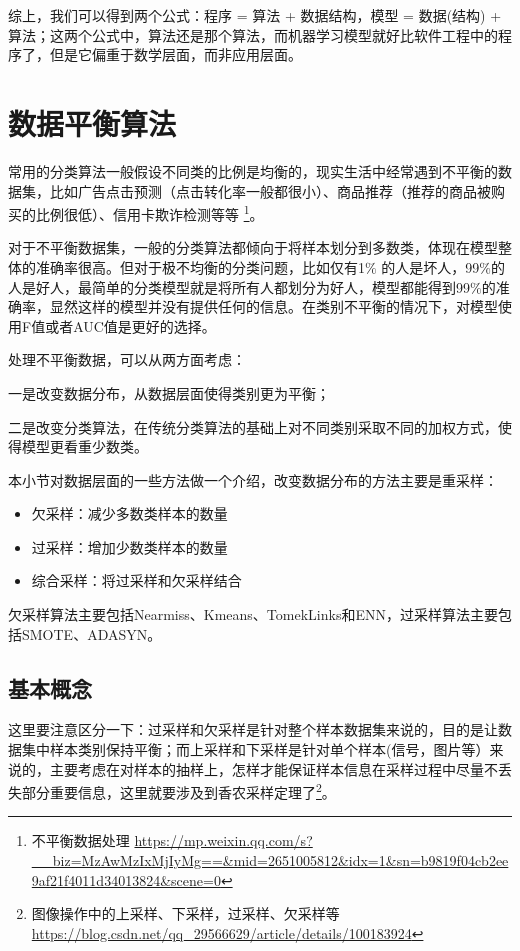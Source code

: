 综上，我们可以得到两个公式：程序 = 算法 + 数据结构，模型 = 数据(结构) + 算法；这两个公式中，算法还是那个算法，而机器学习模型就好比软件工程中的程序了，但是它偏重于数学层面，而非应用层面。

\section{数据平衡算法}

常用的分类算法一般假设不同类的比例是均衡的，现实生活中经常遇到不平衡的数据集，比如广告点击预测（点击转化率一般都很小）、商品推荐（推荐的商品被购买的比例很低）、信用卡欺诈检测等等 \footnote{不平衡数据处理 \quad \url{https://mp.weixin.qq.com/s?__biz=MzAwMzIxMjIyMg==&mid=2651005812&idx=1&sn=b9819f04cb2ee9af21f4011d34013824&scene=0}}。

对于不平衡数据集，一般的分类算法都倾向于将样本划分到多数类，体现在模型整体的准确率很高。但对于极不均衡的分类问题，比如仅有1$\%$ 的人是坏人，99$\%$的人是好人，最简单的分类模型就是将所有人都划分为好人，模型都能得到99$\%$的准确率，显然这样的模型并没有提供任何的信息。在类别不平衡的情况下，对模型使用F值或者AUC值是更好的选择。

处理不平衡数据，可以从两方面考虑：

一是改变数据分布，从数据层面使得类别更为平衡；

二是改变分类算法，在传统分类算法的基础上对不同类别采取不同的加权方式，使得模型更看重少数类。

本小节对数据层面的一些方法做一个介绍，改变数据分布的方法主要是重采样：
\begin{itemize}
    \item 欠采样：减少多数类样本的数量
    \item 过采样：增加少数类样本的数量
    \item 综合采样：将过采样和欠采样结合
\end{itemize}

欠采样算法主要包括Nearmiss、Kmeans、TomekLinks和ENN，过采样算法主要包括SMOTE、ADASYN。

\subsection{基本概念}

这里要注意区分一下：过采样和欠采样是针对整个样本数据集来说的，目的是让数据集中样本类别保持平衡；而上采样和下采样是针对单个样本(信号，图片等）来说的，主要考虑在对样本的抽样上，怎样才能保证样本信息在采样过程中尽量不丢失部分重要信息，这里就要涉及到香农采样定理了\footnote{图像操作中的上采样、下采样，过采样、欠采样等 \quad \url{https://blog.csdn.net/qq_29566629/article/details/100183924}}。


